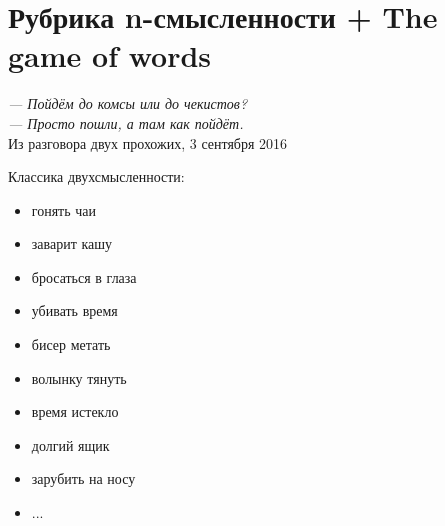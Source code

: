 \section{Рубрика n-смысленности + The game of words}

\begin{displayquote}
    \begin{flushright}
        \emph{--- Пойдём до комсы или до чекистов?\\
        --- Просто пошли, а там как пойдёт.}\\
        Из разговора двух прохожих, 3 сентября 2016
    \end{flushright}
\end{displayquote}

Классика двухсмысленности:
\begin{itemize}
    \item гонять чаи
    \item заварит кашу
    \item бросаться в глаза
    \item убивать время
    \item бисер метать
    \item волынку тянуть
    \item время истекло
    \item долгий ящик
    \item зарубить на носу
    \item ...
\end{itemize}

\begin{flushright}\end{flushright}

